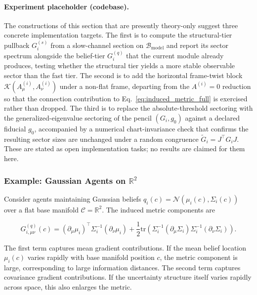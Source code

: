 \documentclass[11pt]{article}
\begin{document}
\paragraph{Experiment placeholder (codebase).} The constructions of this section that are presently theory-only suggest three concrete implementation targets. The first is to compute the structural-tier pullback $G_i^{(s)}$ from a slow-channel section on $\mathcal{B}_{\mathrm{model}}$ and report its sector spectrum alongside the belief-tier $G_i^{(q)}$ that the current module already produces, testing whether the structural tier yields a more stable observable sector than the fast tier. The second is to add the horizontal frame-twist block $\mathcal{K}(A^{(i)}_\mu, A^{(i)}_\nu)$ under a non-flat frame, departing from the $A^{(i)} = 0$ reduction so that the connection contribution to Eq.~\eqref{eq:induced_metric_full} is exercised rather than dropped. The third is to replace the absolute-threshold sectoring with the generalized-eigenvalue sectoring of the pencil $(G_i, g_0)$ against a declared fiducial $g_0$, accompanied by a numerical chart-invariance check that confirms the resulting sector sizes are unchanged under a random congruence $\tilde{G}_i = J^{\top} G_i J$. These are stated as open implementation tasks; no results are claimed for them here.

\subsubsection{Example: Gaussian Agents on $\mathbb{R}^2$}

Consider agents maintaining Gaussian beliefs $q_i(c) = \mathcal{N}(\mu_i(c), \Sigma_i(c))$ over a flat base manifold $\mathcal{C} = \mathbb{R}^2$. The induced metric components are

\begin{equation}
G^{(q)}_{i,\mu\nu}(c) = (\partial_\mu \mu_i)^\top \Sigma_i^{-1} (\partial_\nu \mu_i) + \frac{1}{2}\mathrm{tr}\left(\Sigma_i^{-1}(\partial_\mu \Sigma_i)\Sigma_i^{-1}(\partial_\nu \Sigma_i)\right).
\end{equation}

The first term captures mean gradient contributions. If the mean belief location $\mu_i(c)$ varies rapidly with base manifold position $c$, the metric component is large, corresponding to large information distances. The second term captures covariance gradient contributions. If the uncertainty structure itself varies rapidly across space, this also enlarges the metric.
\end{document}
